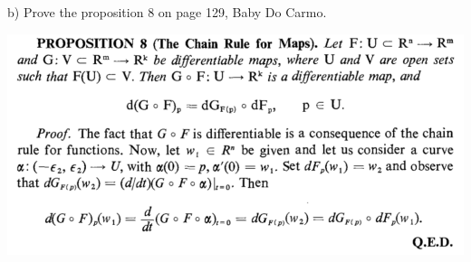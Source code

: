 \documentclass[10pt,letterpaper]{hmcpset}
\begin{document}
\newpage \begin{problem}
b) Prove the proposition 8 on page 129, Baby Do Carmo.

\includegraphics[scale=0.7]{Ab.png}
\end{problem}
\begin{solution}
\end{solution}
\end{document}
